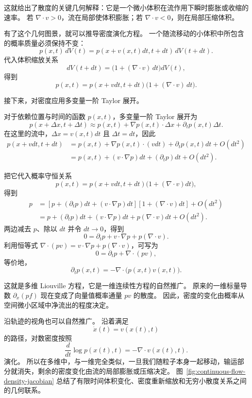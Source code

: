 这就给出了散度的关键几何解释：它是一个微小体积在流作用下瞬时膨胀或收缩的速率。
若 $\nabla\cdot v>0$，流在局部使体积膨胀；若 $\nabla\cdot v<0$，则在局部压缩体积。

有了这个几何图景，就可以推导密度演化方程。
一个随流移动的小体积中所包含的概率质量必须保持不变：
\[
p(x,t)\,dV(t)
=
p(x+v(x,t)dt,t+dt)\,dV(t+dt).
\]
代入体积缩放关系
\[
dV(t+dt)=\bigl(1+(\nabla\cdot v)\,dt\bigr)dV(t),
\]
得到
\[
p(x,t)
=
p(x+vdt,t+dt)\bigl(1+(\nabla\cdot v)\,dt\bigr).
\]

接下来，对密度应用多变量一阶 Taylor 展开。
\begin{tcolorbox}[
  colback=blue!4,
  colframe=blue!50!black,
  title={多维 Liouville 方程的推导},
  boxrule=0.6pt,
  arc=2mm,
  left=2mm,
  right=2mm,
  top=1mm,
  bottom=1mm
]
对于依赖位置与时间的函数 $p(x,t)$，多变量一阶 Taylor 展开为
\[
p(x+\Delta x,t+\Delta t)
\approx
p(x,t)+\nabla p(x,t)\cdot \Delta x+\partial_t p(x,t)\Delta t.
\]
在这里的流中，$\Delta x=v(x,t)dt$ 且 $\Delta t=dt$，因此
\[
\begin{aligned}
p(x+vdt,t+dt)
&=
p(x,t)+\nabla p(x,t)\cdot(vdt)+\partial_t p(x,t)dt+O(dt^2)\\
&=
p(x,t)+(v\cdot\nabla p)dt+(\partial_t p)dt+O(dt^2).
\end{aligned}
\]

把它代入概率守恒关系
\[
p(x,t)
=
p(x+vdt,t+dt)\bigl(1+(\nabla\cdot v)dt\bigr),
\]
得到
\[
\begin{aligned}
p
&=
\left[p+(\partial_t p)dt+(v\cdot\nabla p)dt\right]
\left[1+(\nabla\cdot v)dt\right]
+O(dt^2)\\
&=
p+(\partial_t p)dt+(v\cdot\nabla p)dt+p(\nabla\cdot v)dt+O(dt^2).
\end{aligned}
\]
两边减去 $p$、除以 $dt$ 并令 $dt\to0$，得到
\[
0=\partial_t p+v\cdot\nabla p+p(\nabla\cdot v).
\]
利用恒等式 $\nabla\cdot(pv)=v\cdot\nabla p+p(\nabla\cdot v)$，可写为
\[
0=\partial_t p+\nabla\cdot(pv),
\]
等价地，
\[
\boxed{
\partial_t p(x,t)=-\nabla\cdot\bigl(p(x,t)v(x,t)\bigr).
}
\]
\end{tcolorbox}

这就是多维 Liouville 方程，它是一维连续性方程的自然推广。
原来的一维标量导数 $\partial_x(pf)$ 现在变成了向量值概率通量 $pv$ 的散度。
因此，密度的变化由概率从空间微小区域中净流出的程度决定。

沿轨迹的视角也可以自然推广。
沿着满足
\[
\dot{x}(t)=v(x(t),t)
\]
的路径，对数密度按照
\[
\boxed{
\frac{d}{dt}\log p(x(t),t)
=
-\nabla\cdot v(x(t),t).
}
\]
演化。
所以在多维中，与一维完全类似，一旦我们随粒子本身一起移动，输运部分就消失，剩余的密度变化由流的局部膨胀或压缩决定。
图~\ref{fig:continuous-flow-density-jacobian} 总结了有限时间体积变化、密度重新缩放和无穷小散度关系之间的几何联系。

